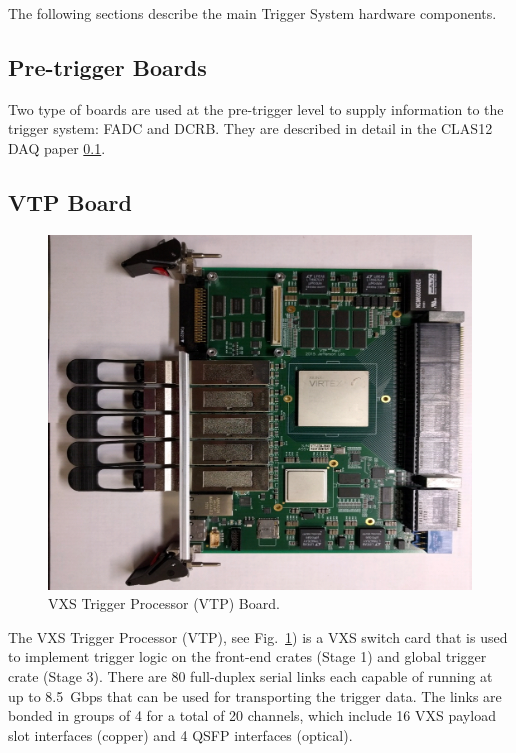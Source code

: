 The following sections describe the main Trigger System hardware components.


\subsection{Pre-trigger Boards}

Two type of boards are used at the pre-trigger level to supply information to the trigger system: FADC and DCRB. They are described in detail in the CLAS12 DAQ paper \ref{}.

\subsection{VTP Board}
\label{sec:vtp_board}

\begin{figure}[hbt]
	\centering
	\includegraphics[width=1.0\columnwidth,keepaspectratio]{img/vtp_board.png}
	\caption{VXS Trigger Processor (VTP) Board.}
	\label{fig:vtp_board}
\end{figure}

The VXS Trigger Processor (VTP), see Fig.~\ref{fig:vtp_board}) is a VXS switch card that is used to implement trigger logic on the front-end crates (Stage 1) and global trigger crate (Stage 3). There are 80 full-duplex serial links each capable of running at up to 8.5~Gbps that can be used for transporting the trigger data. The links are bonded in groups of 4 for a total of 20 channels, which include 16 VXS payload slot interfaces (copper) and 4 QSFP interfaces (optical).

